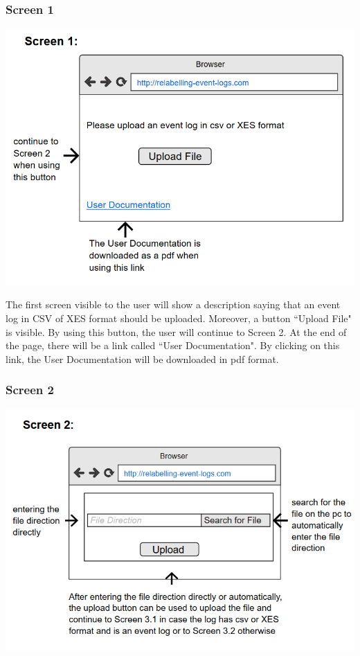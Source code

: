 \documentclass[notitlepage]{article}
\begin{document}
\begin{flushleft}
\subsubsection{Screen 1}

\includegraphics[scale=0.8]{InterfaceMockup1.png}


The first screen visible to the user will show a description saying that an event log in CSV of XES format should be uploaded. Moreover, a button ``Upload File" is visible. By using this button, the user will continue to Screen 2. At the end of the page, there will be a link called ``User Documentation". By clicking on this link, the User Documentation will be downloaded in pdf format.
\subsubsection{Screen 2}

\includegraphics[scale=0.9]{InterfaceMockup2.png}


\end{flushleft}
\end{document}

